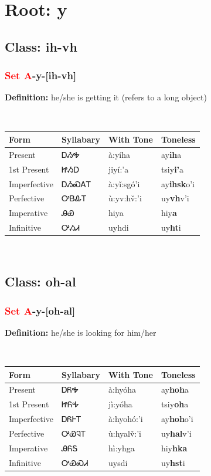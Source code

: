 \needspace{4in}
\section*{Root: y}
\nopagebreak
{}
\needspace{3in}
\subsection*{Class: ih-vh}
\nopagebreak
\needspace{2in}
\subsubsection*{\textcolor{Red}{Set A}{-}\textbf{y}{-}[ih-vh]}
\nopagebreak
\textbf{Definition: } he/she is getting it (refers to a long object)
\\[0.5em]
\begin{tabularx}{\textwidth}{l X X X}%
\toprule%
\textbf{Form}&\textbf{Syllabary}&\textbf{With Tone}&\textbf{Toneless}\\%
\midrule%
Present&ᎠᏱᎭ&à:yíha&ay\textbf{ih}a\\%
1st Present&ᏥᏱᎠ&jiyí:’a&tsiy\textbf{i'}a\\%
Imperfective&ᎠᏱᏍᎪᎢ&à:yǐ:sgó’i&ay\textbf{ihsk}o'i\\%
Perfective&ᎤᏴᎲᎢ&ù:yv:hv̌:’i&uy\textbf{vh}v'i\\%
Imperative&ᎯᏯ&hiya&hiy\textbf{a}\\%
Infinitive&ᎤᏱᏗ&uyhdi&uy\textbf{ht}i\\%
\bottomrule%
\end{tabularx}
\\[1em]
\needspace{3in}
\subsection*{Class: oh-al}
\nopagebreak
\needspace{2in}
\subsubsection*{\textcolor{Red}{Set A}{-}\textbf{y}{-}[oh-al]}
\nopagebreak
\textbf{Definition: } he/she is looking for him/her
\\[0.5em]
\begin{tabularx}{\textwidth}{l X X X}%
\toprule%
\textbf{Form}&\textbf{Syllabary}&\textbf{With Tone}&\textbf{Toneless}\\%
\midrule%
Present&ᎠᏲᎭ&à:hyóha&ay\textbf{hoh}a\\%
1st Present&ᏥᏲᎭ&jì:yóha&tsiy\textbf{oh}a\\%
Imperfective&ᎠᏲᎰᎢ&à:hyohó:’i&ay\textbf{hoh}o'i\\%
Perfective&ᎤᏯᎸᎢ&ù:hyalv̌:’i&uy\textbf{hal}v'i\\%
Imperative&ᎯᏲᎦ&hì:yhga&hiy\textbf{hka}\\%
Infinitive&ᎤᏯᏍᏗ&uysdi&uy\textbf{hst}i\\%
\bottomrule%
\end{tabularx}
\\[1em]
\needspace{2in}
